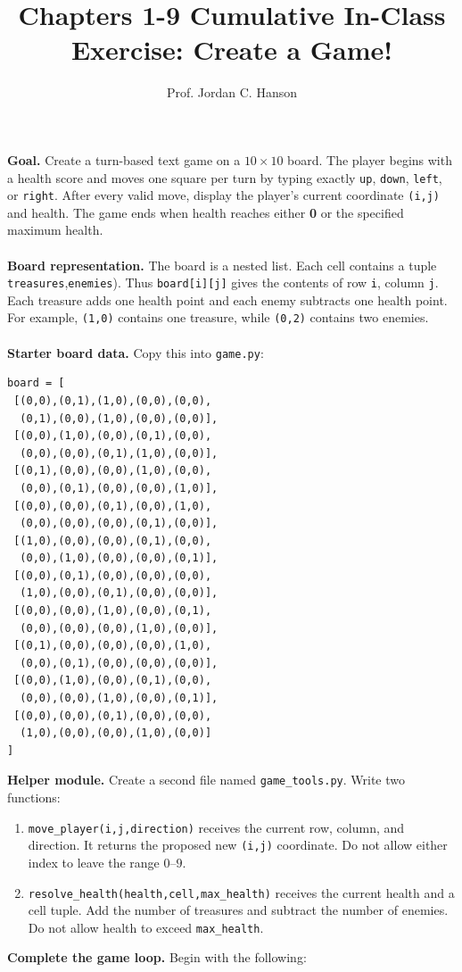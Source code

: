 \documentclass{article}
\begin{document}
\twocolumn

\title{Chapters 1-9 Cumulative In-Class Exercise: Create a Game!}
\author{Prof. Jordan C. Hanson}
\date{}

\maketitle

\noindent
\textbf{Goal.} Create a turn-based text game on a $10\times10$ board. The player begins with a health score and moves one square per turn by typing exactly \texttt{up}, \texttt{down}, \texttt{left}, or \texttt{right}.  After every valid move, display the player's current coordinate \texttt{(i,j)} and health. The game ends when health reaches either \textbf{0} or the specified maximum health. \\ \\
\noindent
\textbf{Board representation.} The board is a nested list. Each cell contains a tuple \texttt{treasures},\texttt{enemies}).  Thus \texttt{board[i][j]} gives the contents of row \texttt{i}, column \texttt{j}. Each treasure adds one health point and each enemy subtracts one health point.  For example, \texttt{(1,0)} contains one treasure, while \texttt{(0,2)} contains two enemies. \\ \\
\noindent
\textbf{Starter board data.} Copy this into \texttt{game.py}:

\begin{verbatim}
board = [
 [(0,0),(0,1),(1,0),(0,0),(0,0),
  (0,1),(0,0),(1,0),(0,0),(0,0)],
 [(0,0),(1,0),(0,0),(0,1),(0,0),
  (0,0),(0,0),(0,1),(1,0),(0,0)],
 [(0,1),(0,0),(0,0),(1,0),(0,0),
  (0,0),(0,1),(0,0),(0,0),(1,0)],
 [(0,0),(0,0),(0,1),(0,0),(1,0),
  (0,0),(0,0),(0,0),(0,1),(0,0)],
 [(1,0),(0,0),(0,0),(0,1),(0,0),
  (0,0),(1,0),(0,0),(0,0),(0,1)],
 [(0,0),(0,1),(0,0),(0,0),(0,0),
  (1,0),(0,0),(0,1),(0,0),(0,0)],
 [(0,0),(0,0),(1,0),(0,0),(0,1),
  (0,0),(0,0),(0,0),(1,0),(0,0)],
 [(0,1),(0,0),(0,0),(0,0),(1,0),
  (0,0),(0,1),(0,0),(0,0),(0,0)],
 [(0,0),(1,0),(0,0),(0,1),(0,0),
  (0,0),(0,0),(1,0),(0,0),(0,1)],
 [(0,0),(0,0),(0,1),(0,0),(0,0),
  (1,0),(0,0),(0,0),(1,0),(0,0)]
]
\end{verbatim}
\noindent
\textbf{Helper module.}  Create a second file named \texttt{game\_tools.py}. Write two functions:

\begin{enumerate}[leftmargin=*,itemsep=1pt]
\item \texttt{move\_player(i,j,direction)} receives the current row, column, and direction. It returns the proposed new \texttt{(i,j)} coordinate. Do not allow either index to leave the range $0$--$9$.
\item \texttt{resolve\_health(health,cell,max\_health)} receives the current health and a cell tuple. Add the number of treasures and subtract the number of enemies. Do not allow health to exceed \texttt{max\_health}.
\end{enumerate} \vspace{0.5cm}
\noindent
\textbf{Complete the game loop.}  Begin with the following:
\end{document}
